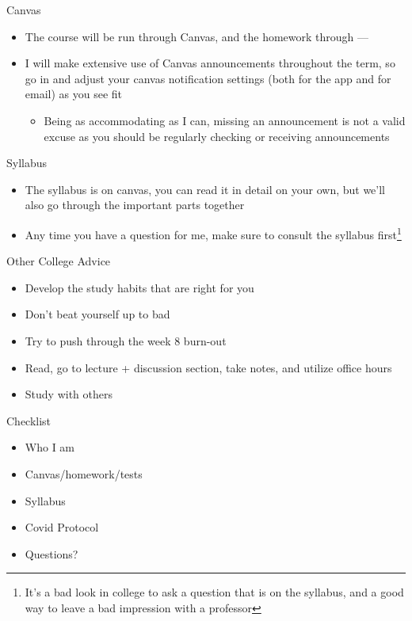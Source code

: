 \documentclass[10pt,xcolor={svgnames}]{beamer}
\begin{document}
\begin{frame}{Canvas}
\begin{itemize}
    \item The course will be run through Canvas, and the homework through ---
    \item I will make extensive use of Canvas announcements throughout the term, so go in and adjust your canvas notification settings (both for the app and for email) as you see fit
    \begin{itemize}
        \item Being as accommodating as I can, missing an announcement is not a valid excuse as you should be regularly checking or receiving announcements 
    \end{itemize}
    
\end{itemize}

\end{frame}


\begin{frame}{Syllabus}
\begin{itemize}
    \item The syllabus is on canvas, you can read it in detail on your own, but we'll also go through the important parts together
    \item Any time you have a question for me, make sure to consult the syllabus first\footnote{It's a bad look in college to ask a question that is on the syllabus, and a good way to leave a bad impression with a professor\vspace{2mm}}
\end{itemize}
\end{frame}

\begin{frame}{Other College Advice}
\begin{itemize}
    \item<1-> Develop the study habits that are right for you
    \item<2-> Don't beat yourself up to bad
    \item<3-> Try to push through the week 8 burn-out
    \item<4-> Read, go to lecture + discussion section, take notes, and utilize office hours
    \item<5-> Study with others
\end{itemize}
    
\end{frame}

\begin{frame}{Checklist}
    \begin{itemize}[<+>]
        \item Who I am
        \item Canvas/homework/tests
        \item Syllabus
        \item Covid Protocol
        \item Questions?
    \end{itemize}
\end{frame}
\end{document}
